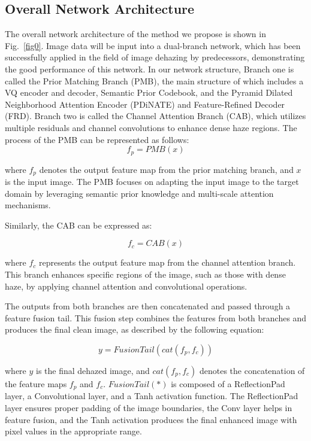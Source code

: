 \documentclass[journal]{IEEEtran}
\begin{document}
\subsection{Overall Network Architecture}
The overall network architecture of the method we propose is shown in Fig.~\ref{fig0}. Image data will be input into a dual-branch network, which has been successfully applied in the field of image dehazing by predecessors, demonstrating the good performance of this network. In our network structure, Branch one is called the Prior Matching Branch (PMB), the main structure of which includes a VQ encoder and decoder, Semantic Prior Codebook, and the Pyramid Dilated Neighborhood Attention Encoder (PDiNATE) and Feature-Refined Decoder (FRD). Branch two is called the Channel Attention Branch (CAB), which utilizes multiple residuals and channel convolutions to enhance dense haze regions. The process of the PMB can be represented as follows:
\begin{equation}
	\label{PMB}
	f_{p} = PMB(x)
\end{equation}

where $f_{p}$ denotes the output feature map from the prior matching branch, and $x$ is the input image. The PMB focuses on adapting the input image to the target domain by leveraging semantic prior knowledge and multi-scale attention mechanisms.

Similarly, the CAB can be expressed as:

\begin{equation}
	\label{CAB}
	f_{c} = CAB(x)
\end{equation}

where $f_{c}$ represents the output feature map from the channel attention branch. This branch enhances specific regions of the image, such as those with dense haze, by applying channel attention and convolutional operations.

The outputs from both branches are then concatenated and passed through a feature fusion tail. This fusion step combines the features from both branches and produces the final clean image, as described by the following equation:

\begin{equation}
	\label{tail}
	y = FusionTail(cat(f_{p}, f_{c}))
\end{equation}

where $y$ is the final dehazed image, and $cat(f_{p}, f_{c})$ denotes the concatenation of the feature maps $f_{p}$ and $f_{c}$. $FusionTail(*)$ is composed of a
ReflectionPad layer, a Convolutional layer, and a Tanh
activation function. The ReflectionPad layer ensures proper padding of the image boundaries, the Conv layer helps in feature fusion, and the Tanh activation produces the final enhanced image with pixel values in the appropriate range.
\end{document}
